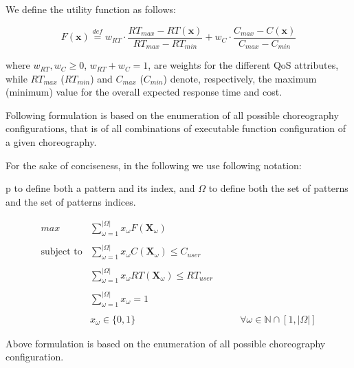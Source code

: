 \documentclass[12pt,a4paper]{report}
\newcommand*{\N}{\mathbb{N}}
\newcommand{\mathDef}{\overset{\textit{def}}{=}}
\theoremstyle{definition}
\begin{document}
We define the utility function as follows:

\begin{equation}
	F(\textbf{x}) \mathDef w_{RT} \cdot \dfrac{RT_{max} - RT(\textbf{x})}{RT_{max} - RT_{min}} + w_{C} \cdot \dfrac{C_{max} - C(\textbf{x})}{C_{max} - C_{min}}
\end{equation}

where $w_{RT}, w_{C} \geq 0$, $w_{RT} + w_{C} = 1$, are weights for the different QoS attributes, while $RT_{max}$ ($RT_{min}$) and $C_{max}$ ($C_{min}$) denote, respectively, the maximum (minimum) value for the overall expected response time and cost.


Following formulation is based on the enumeration of all possible choreography configurations, that is of all combinations of executable function configuration of a given choreography.

For the sake of conciseness, in the following we use following notation: 

p to define both a pattern and its index, and $\Omega$ to define both the set of patterns and the
set of patterns indices.



\begin{equation}
	\begin{array} {rll} 
		\displaystyle max & \displaystyle \sum_{\omega = 1}^{|\Omega|} x_{\omega} F(\textbf{X}_{\omega}) \\\\
		
		\text{subject to} & \displaystyle \sum_{\omega = 1}^{|\Omega|} x_{\omega} C(\textbf{X}_{\omega}) \leq C_{user} \\\\
		
		& \displaystyle \sum_{\omega = 1}^{|\Omega|} x_{\omega} RT(\textbf{X}_{\omega}) \leq RT_{user} \\\\ 
		
		& \displaystyle \sum_{\omega = 1}^{|\Omega|} x_{\omega} = 1 & \\\\
		
		
		& x_{\omega} \in \lbrace 0, 1 \rbrace & \qquad \forall \omega \in \N \cap [1,|\Omega|]
	\end{array}
\end{equation}

Above formulation is based on the enumeration of all possible choreography configuration.
\end{document}
